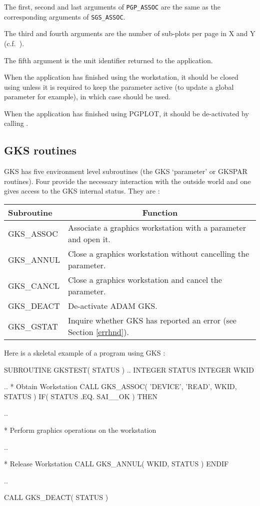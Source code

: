\documentclass[twoside,11pt,nolof]{starlink}
\begin{document}
The first, second and last arguments of \texttt{PGP\_ASSOC} are the same as the
corresponding arguments of \texttt{SGS\_ASSOC}.

The third and fourth arguments are the number of sub-plots per page in X and Y
(c.f.\ ).

The fifth argument is the unit identifier returned to the application.

When the application has finished using the workstation, it should be closed
using 
unless it is required to keep the parameter active
(to update a global parameter for example), in which case
 should be used.

When the application has finished using PGPLOT, it should be de-activated by
calling .

\subsection{GKS routines}

GKS has five environment level subroutines (the GKS `parameter' or GKSPAR
routines). Four provide the necessary interaction with the outside world
and one gives access to the GKS internal status.
They are :

\begin{center}
\begin{tabular}{||l|l||} \hline
Subroutine & \multicolumn{1}{c||}{Function} \\ \hline
GKS\_ASSOC  & Associate a graphics workstation with a parameter and open it.\\
GKS\_ANNUL  & Close a graphics workstation without cancelling the parameter.\\
GKS\_CANCL  & Close a graphics workstation and cancel the parameter.\\
GKS\_DEACT  & De-activate ADAM GKS.\\
GKS\_GSTAT  & Inquire whether GKS has reported an error
(see Section \ref{errhnd}). \\ \hline
\end{tabular}
\end{center}

Here is a skeletal example of a program using GKS :
\begin{small}
\begin{terminalv}
      SUBROUTINE GKSTEST( STATUS )
      ..
      INTEGER STATUS
      INTEGER WKID

      ..
*    Obtain Workstation
      CALL GKS_ASSOC( 'DEVICE', 'READ', WKID, STATUS )
      IF( STATUS .EQ. SAI__OK ) THEN

         ..

*    Perform graphics operations on the workstation

         ..

*       Release Workstation
         CALL GKS_ANNUL( WKID, STATUS )
      ENDIF

      ..

      CALL GKS_DEACT( STATUS )
\end{terminalv}
\end{small}
\end{document}
